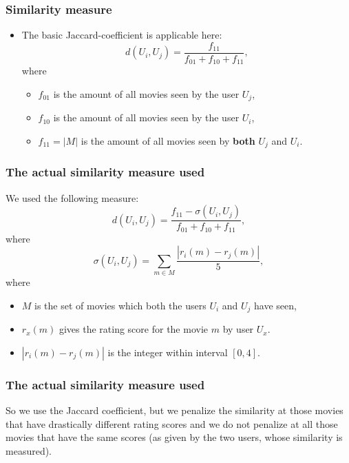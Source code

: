 \documentclass{beamer}
\begin{document}
\begin{frame}
  \frametitle{Similarity measure}
  \pause
  \begin{itemize}
   \item The basic Jaccard-coefficient is applicable here:
  \[
  d(U_i, U_j) = \frac{f_{11}}{f_{01} + f_{10} + f_{11}}, 
  \]
  \pause
  where 
    \begin{itemize}
    \pause
    \item $f_{01}$ is the amount of all movies seen by the user $U_j$,
    \pause
    \item $f_{10}$ is the amount of all movies seen by the user $U_i$,
    \pause
    \item $f_{11} = |M|$ is the amount of all movies seen by \textbf{both} $U_j$ and $U_i$.
    \end{itemize}
  \end{itemize}
\end{frame}

\begin{frame}
  \frametitle{The actual similarity measure used}
  \pause
  We used the following measure:
  \[
  d(U_i, U_j) = \frac{f_{11} - \sigma(U_i, U_j)}{f_{01} + f_{10} + f_{11}}, 
  \]
  \pause
  where
  \[
  \sigma(U_i, U_j) = \sum_{m \in M} \frac{|r_i(m)  - r_j(m)|}{5},
  \]
  \pause
  where
  \begin{itemize}
  \item $M$ is the set of movies which both the users $U_i$ and $U_j$ have seen,
  \pause
  \item  $r_x(m)$ gives the rating score for the movie $m$ by user $U_x$.
  \pause
  \item $|r_i(m) - r_j(m)|$ is the integer within interval $[0, 4]$.
  \end{itemize}
\end{frame}
  
\begin{frame}
\frametitle{The actual similarity measure used}
So we use the Jaccard coefficient, but we penalize the similarity at those movies that have drastically different rating scores and we do not penalize at all those movies that have the same scores (as given by the two users, whose similarity is measured).
\end{frame}
\end{document}
